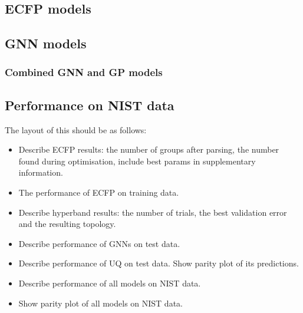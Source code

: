 \subsection{ECFP models}

\subsection{GNN models}

\subsubsection{Combined GNN and GP models}

\subsection{Performance on NIST data}

The layout of this should be as follows:
\begin{itemize}
    \item Describe ECFP results: the number of groups after parsing, the number found during optimisation, include best params in supplementary information.
    \item The performance of ECFP on training data.
    \item Describe hyperband results: the number of trials, the best validation error and the resulting topology.
    \item Describe performance of GNNs on test data.
    \item Describe performance of UQ on test data. Show parity plot of its predictions.
    \item Describe performance of all models on NIST data.
    \item Show parity plot of all models on NIST data.
\end{itemize}